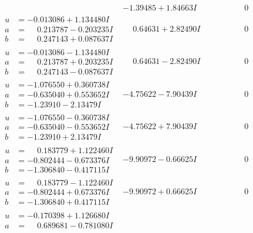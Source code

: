 \documentclass[1p]{elsarticle_modified}
\theoremstyle{definition}
\begin{document}
$$\begin{array}{c|c|c}
 & -1.39485 + 1.84663 I & \phantom{-0.000000 } 0 \\ \hline\begin{aligned}
u &= -0.013086 + 1.134480 I \\
a &= \phantom{-}0.213787 - 0.203235 I \\
b &= \phantom{-}0.247143 + 0.087637 I\end{aligned}
 & \phantom{-}0.64631 + 2.82490 I & \phantom{-0.000000 } 0 \\ \hline\begin{aligned}
u &= -0.013086 - 1.134480 I \\
a &= \phantom{-}0.213787 + 0.203235 I \\
b &= \phantom{-}0.247143 - 0.087637 I\end{aligned}
 & \phantom{-}0.64631 - 2.82490 I & \phantom{-0.000000 } 0 \\ \hline\begin{aligned}
u &= -1.076550 + 0.360738 I \\
a &= -0.635040 + 0.553652 I \\
b &= -1.23910 - 2.13479 I\end{aligned}
 & -4.75622 - 7.90439 I & \phantom{-0.000000 } 0 \\ \hline\begin{aligned}
u &= -1.076550 - 0.360738 I \\
a &= -0.635040 - 0.553652 I \\
b &= -1.23910 + 2.13479 I\end{aligned}
 & -4.75622 + 7.90439 I & \phantom{-0.000000 } 0 \\ \hline\begin{aligned}
u &= \phantom{-}0.183779 + 1.122460 I \\
a &= -0.802444 - 0.673376 I \\
b &= -1.306840 - 0.417115 I\end{aligned}
 & -9.90972 - 0.66625 I & \phantom{-0.000000 } 0 \\ \hline\begin{aligned}
u &= \phantom{-}0.183779 - 1.122460 I \\
a &= -0.802444 + 0.673376 I \\
b &= -1.306840 + 0.417115 I\end{aligned}
 & -9.90972 + 0.66625 I & \phantom{-0.000000 } 0 \\ \hline\begin{aligned}
u &= -0.170398 + 1.126680 I \\
a &= \phantom{-}0.689681 - 0.781080 I \\

\end{aligned}
\end{array}$$
\end{document}
